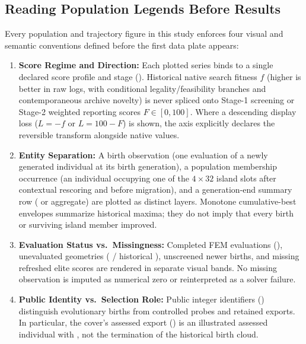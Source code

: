 \subsection{Reading Population Legends Before Results}
\label{subsec:population-legend-conventions}
Every population and trajectory figure in this study enforces four visual and semantic conventions defined before the first data plate appears:
\begin{enumerate}
  \item \textbf{Score Regime and Direction:} Each plotted series binds to a single declared score profile and stage (). Historical native search fitness $f$ (higher is better in raw logs, with conditional legality/feasibility branches and contemporaneous archive novelty) is never spliced onto Stage-1 screening or Stage-2 weighted reporting scores $F \in [0,100]$. Where a descending display loss ($L = -f$ or $L = 100 - F$) is shown, the axis explicitly declares the reversible transform alongside native values.
  \item \textbf{Entity Separation:} A birth observation (one evaluation of a newly generated individual at its birth generation), a population membership occurrence (an individual occupying one of the $4 \times 32$ island slots after contextual rescoring and before migration), and a generation-end summary row ( or  aggregate) are plotted as distinct layers. Monotone cumulative-best envelopes summarize historical maxima; they do not imply that every birth or surviving island member improved.
  \item \textbf{Evaluation Status vs.\ Missingness:} Completed FEM evaluations (), unevaluated geometries ( / historical ), unscreened newer births, and missing refreshed elite scores are rendered in separate visual bands. No missing observation is imputed as numerical zero or reinterpreted as a solver failure.
  \item \textbf{Public Identity vs.\ Selection Role:} Public integer identifiers () distinguish evolutionary births from controlled probes and retained exports. In particular, the cover's assessed export () is an illustrated assessed individual with , not the termination of the historical  birth cloud.
\end{enumerate}

